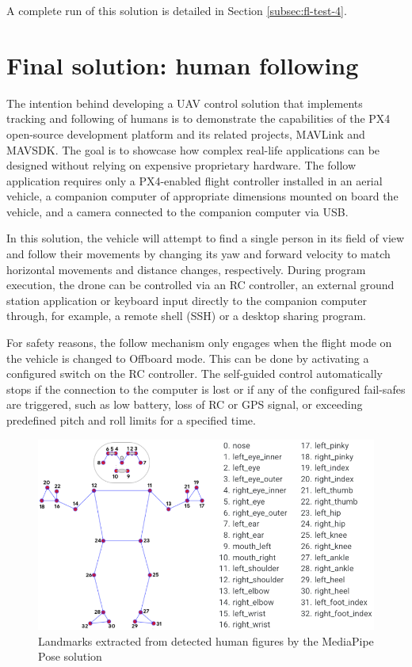 A complete run of this solution is detailed in Section \ref{subsec:fl-test-4}.


\section{Final solution: human following}
\label{sec:follow}

The intention behind developing a UAV control solution that implements tracking and following of humans is to demonstrate the capabilities of the PX4 open-source development platform and its related projects, MAVLink and MAVSDK. The goal is to showcase how complex real-life applications can be designed without relying on expensive proprietary hardware. The follow application requires only a PX4-enabled flight controller installed in an aerial vehicle, a companion computer of appropriate dimensions mounted on board the vehicle, and a camera connected to the companion computer via USB.

In this solution, the vehicle will attempt to find a single person in its field of view and follow their movements by changing its yaw and forward velocity to match horizontal movements and distance changes, respectively.
During program execution, the drone can be controlled via an RC controller, an external ground station application or keyboard input directly to the companion computer through, for example, a remote shell (SSH) or a desktop sharing program.

For safety reasons, the follow mechanism only engages when the flight mode on the vehicle is changed to Offboard mode. This can be done by activating a configured switch on the RC controller. The self-guided control automatically stops if the connection to the computer is lost or if any of the configured fail-safes are triggered, such as low battery, loss of RC or GPS signal, or exceeding predefined pitch and roll limits for a specified time.

\begin{figure}
  \centering
  \includegraphics[width=\textwidth, keepaspectratio]{img/pose-landmarks.png}
  \caption{Landmarks extracted from detected human figures by the MediaPipe Pose solution}
  \label{fig:pose-landmarks}
\end{figure}

